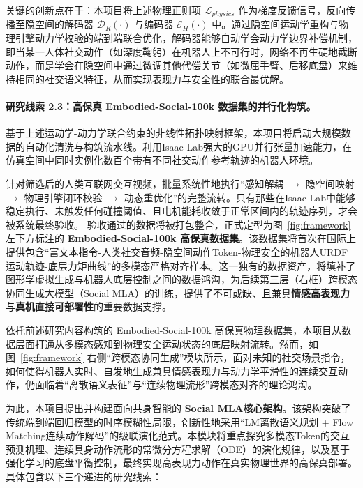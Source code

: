 关键的创新点在于：本项目将上述物理正则项 $\mathcal{L}_{physics}$ 作为梯度反馈信号，反向传播至隐空间的解码器 $\mathcal{D}_R(\cdot)$ 与编码器 $\mathcal{E}_H(\cdot)$ 中。通过隐空间运动学重构与物理引擎动力学校验的端到端联合优化，解码器能够自动学会动力学边界补偿机制，即当某一人体社交动作（如深度鞠躬）在机器人上不可行时，网络不再生硬地截断动作，而是学会在隐空间中通过微调其他代偿关节（如微屈手臂、后移底盘）来维持相同的社交语义特征，从而实现表现力与安全性的联合最优解。

\paragraph{\textbf{研究线索 2.3：高保真 Embodied-Social-100k 数据集的并行化构筑。}}

基于上述运动学-动力学联合约束的非线性拓扑映射框架，本项目将启动大规模数据的自动化清洗与构筑流水线。利用Isaac Lab强大的GPU并行张量加速能力，在仿真空间中同时实例化数百个带有不同社交动作参考轨迹的机器人环境。

针对筛选后的人类互联网交互视频，批量系统性地执行“感知解耦 $\rightarrow$ 隐空间映射 $\rightarrow$ 物理引擎闭环校验 $\rightarrow$ 动态重优化”的完整流转。只有那些在Isaac Lab中能够稳定执行、未触发任何碰撞阈值、且电机能耗收敛于正常区间内的轨迹序列，才会被系统最终验收。
验收通过的数据将被打包整合，正式定型为图~\ref{fig:framework}左下方标注的 \textbf{Embodied-Social-100k 高保真数据集}。该数据集将首次在国际上提供包含“富文本指令-人类社交音频-隐空间动作Token-物理安全的机器人URDF运动轨迹-底层力矩曲线”的多模态严格对齐样本。这一独有的数据资产，将填补了图形学虚拟生成与机器人底层控制之间的数据鸿沟，为后续第三层（右框）跨模态协同生成大模型（Social MLA）的训练，提供了不可或缺、且兼具\textbf{情感高表现力}与\textbf{真机直接可部署性}的重要数据支撑。



依托前述研究内容构筑的 Embodied-Social-100k 高保真物理数据集，本项目从数据层面打通从多模态感知到物理安全运动状态的底层映射流转。然而，如图~\ref{fig:framework} 右侧“跨模态协同生成”模块所示，面对未知的社交场景指令，如何使得机器人实时、自发地生成兼具情感表现力与动力学平滑性的连续交互动作，仍面临着“离散语义表征”与“连续物理流形”跨模态对齐的理论鸿沟。

为此，本项目提出并构建面向共身智能的 \textbf{Social MLA核心架构}。该架构突破了传统端到端回归模型的时序模糊性局限，创新性地采用“LM离散语义规划 + Flow Matching连续动作解码”的级联演化范式。本模块将重点探究多模态Token的交互预测机理、连续具身动作流形的常微分方程求解（ODE）的演化规律，以及基于强化学习的底盘平衡控制，最终实现高表现力动作在真实物理世界的高保真部署。具体包含以下三个递进的研究线索：

